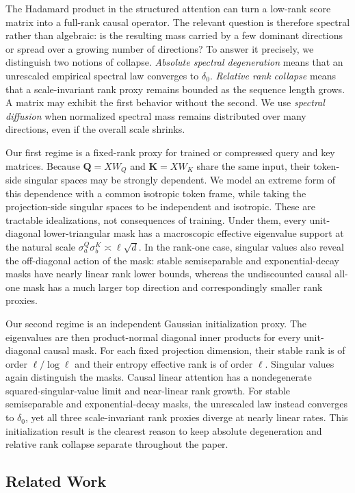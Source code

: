 \documentclass{article}
\newcommand{\bQ}{\mathbf{Q}}
\newcommand{\bK}{\mathbf{K}}
\theoremstyle{definition}
\theoremstyle{remark}
\begin{document}
The Hadamard product in the structured attention can turn a low-rank score matrix into a
full-rank causal operator.  The relevant question is therefore spectral rather
than algebraic: is the resulting mass carried by a few dominant directions or
spread over a growing number of directions?  To answer it precisely, we
distinguish two notions of collapse.  \emph{Absolute spectral degeneration}
means that an unrescaled empirical spectral law converges to $\delta_0$.
\emph{Relative rank collapse} means that a scale-invariant rank proxy remains
bounded as the sequence length grows.  A matrix may exhibit the first behavior
without the second.  We use \emph{spectral diffusion} when normalized spectral
mass remains distributed over many directions, even if the overall scale
shrinks.

Our first regime is a fixed-rank proxy for trained or compressed query and key
matrices.  Because $\bQ=XW_Q$ and $\bK=XW_K$ share the same input, their
token-side singular spaces may be strongly dependent.  We model an extreme
form of this dependence with a common isotropic token frame, while taking the
projection-side singular spaces to be independent and isotropic.  These are
tractable idealizations, not consequences of training.  Under them, every
unit-diagonal lower-triangular mask has a macroscopic effective eigenvalue
support at the natural scale $\sigma_a^Q\sigma_b^K\asymp\ell\sqrt d$.  In the
rank-one case, singular values also reveal the off-diagonal action of the mask:
stable semiseparable and exponential-decay masks have nearly linear rank lower
bounds, whereas the undiscounted causal all-one mask has a much larger top
direction and correspondingly smaller rank proxies.

Our second regime is an independent Gaussian initialization proxy.  The
eigenvalues are then product-normal diagonal inner products for every
unit-diagonal causal mask.  For each fixed projection dimension, their stable
rank is of order $\ell/\log\ell$ and their entropy effective rank is of order
$\ell$.  Singular values again distinguish the masks.  Causal linear attention
has a nondegenerate squared-singular-value limit and near-linear rank growth.
For stable semiseparable and exponential-decay masks, the unrescaled law instead
converges to $\delta_0$, yet all three scale-invariant rank proxies diverge at nearly
linear rates.  This initialization result is the clearest reason to keep
absolute degeneration and relative rank collapse separate throughout the
paper.

\subsection{Related Work}
\end{document}
